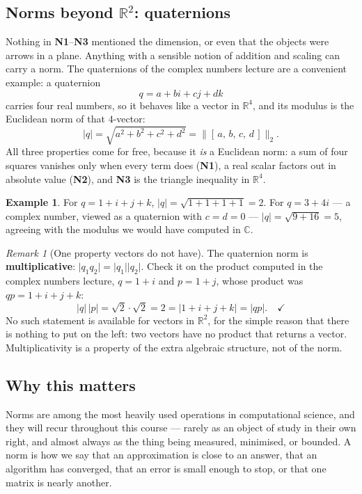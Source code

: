 \documentclass[11pt]{article}
\theoremstyle{definition}
\newtheorem{ex}{Example}[section]
\theoremstyle{remark}
\newtheorem*{rmk}{Remark}
\newcommand{\R}{\mathbb{R}}
\begin{document}
\subsection{Norms beyond \texorpdfstring{$\R^{2}$}{R2}: quaternions}
Nothing in \textbf{N1}--\textbf{N3} mentioned the dimension, or even that the
objects were arrows in a plane. Anything with a sensible notion of addition and
scaling can carry a norm. The quaternions of the complex numbers lecture are a
convenient example: a quaternion
\[
  q = a+bi+cj+dk
\]
carries four real numbers, so it behaves like a vector in $\R^{4}$, and its
modulus is the Euclidean norm of that $4$-vector:
\[
  \lvert q\rvert = \sqrt{a^{2}+b^{2}+c^{2}+d^{2}}
  = \bigl\lVert [\,a,\,b,\,c,\,d\,]\bigr\rVert_2 .
\]
All three properties come for free, because it \emph{is} a Euclidean norm: a sum
of four squares vanishes only when every term does (\textbf{N1}), a real scalar
factors out in absolute value (\textbf{N2}), and \textbf{N3} is the triangle
inequality in $\R^{4}$.

\begin{ex}
For $q=1+i+j+k$, $\lvert q\rvert=\sqrt{1+1+1+1}=2$. For $q=3+4i$ --- a complex
number, viewed as a quaternion with $c=d=0$ --- $\lvert q\rvert=\sqrt{9+16}=5$,
agreeing with the modulus we would have computed in $\mathbb{C}$.
\end{ex}

\begin{rmk}[One property vectors do not have]
The quaternion norm is \textbf{multiplicative}:
$\lvert q_1q_2\rvert=\lvert q_1\rvert\lvert q_2\rvert$. Check it on the product
computed in the complex numbers lecture, $q=1+i$ and $p=1+j$, whose product was
$qp=1+i+j+k$:
\[
  \lvert q\rvert\,\lvert p\rvert = \sqrt2\cdot\sqrt2 = 2
  = \lvert 1+i+j+k\rvert = \lvert qp\rvert . \quad\checkmark
\]
No such statement is available for vectors in $\R^{2}$, for the simple reason
that there is nothing to put on the left: two vectors have no product that
returns a vector. Multiplicativity is a property of the extra algebraic
structure, not of the norm.
\end{rmk}

\subsection{Why this matters}
Norms are among the most heavily used operations in computational science, and
they will recur throughout this course --- rarely as an object of study in their
own right, and almost always as the thing being measured, minimised, or bounded.
A norm is how we say that an approximation is close to an answer, that an
algorithm has converged, that an error is small enough to stop, or that one
matrix is nearly another.
\end{document}
